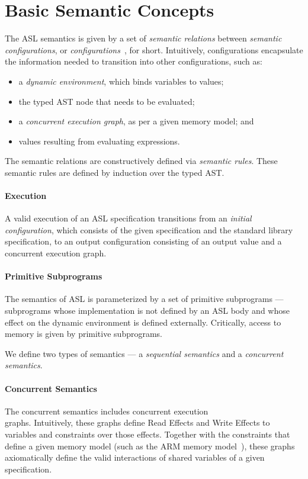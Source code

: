 \documentclass{book}
\begin{document}
\section{Basic Semantic Concepts}
The ASL semantics is given by a set of \emph{semantic relations} between \emph{semantic configurations},
or \emph{configurations}~\cite{SemanticsWithApplicationsBook}, for short.
Intuitively, configurations encapsulate the information needed to transition into other configurations,
such as:
\begin{itemize}
  \item a \emph{dynamic environment}, which binds variables to values;
  \item the typed AST node that needs to be evaluated;
  \item a \emph{concurrent execution graph}, as per a given memory model; and
  \item values resulting from evaluating expressions.
\end{itemize}
The semantic relations are constructively defined via \emph{semantic rules}.
These semantic rules are defined by induction over the typed AST.

\paragraph{Execution}
A valid execution of an ASL specification transitions from an \emph{initial configuration},
which consists of the given specification and the standard library specification, to an output configuration
consisting of an output value and a concurrent execution graph.

\paragraph{Primitive Subprograms}
The semantics of ASL is parameterized by a set of primitive subprograms ---
subprograms whose implementation is not defined by an ASL body and whose effect on the dynamic environment
is defined externally. Critically, access to memory is given by primitive subprograms.

We define two types of semantics --- a \emph{sequential semantics} and a \emph{concurrent semantics}.

\paragraph{Concurrent Semantics}
The concurrent semantics includes concurrent execution \\ graphs.
Intuitively, these graphs define Read Effects and Write Effects to variables and constraints over those effects.
Together with the constraints that define a given memory model (such as the ARM memory model~\cite{AlglaveDGHM21}),
these graphs axiomatically define
the valid interactions of shared variables of a given specification.
\end{document}
